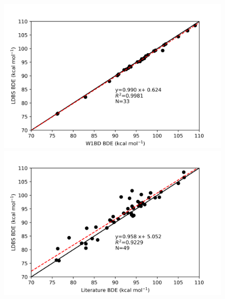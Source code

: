 \begin{doublespace}

\begin{figure}[H]
\hspace*{-1.2cm}
\begin{minipage}{8cm}
  \centering
  \includegraphics[width=\textwidth]{figures/w1bd-ldbs}
\end{minipage}%
\begin{minipage}{8cm}
  \centering
  \includegraphics[width=\textwidth]{figures/lit-ldbs}
\end{minipage}


\end{figure}
\end{doublespace}
